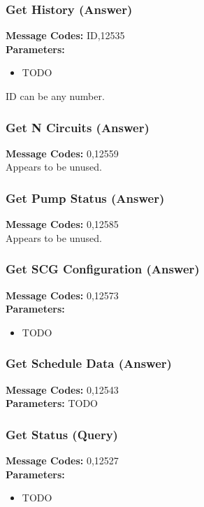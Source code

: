\documentclass[11pt]{article}
\begin{document}
\subsubsection{Get History (Answer)}
\label{msg:12535}
{\bf Message Codes: } ID,12535\\
{\bf Parameters: }
\small
\begin{itemize}
\item {\color{red} TODO}
\end{itemize}
\normalsize
ID can be any number.

\subsubsection{Get N Circuits (Answer)}
\label{msg:12559}
{\bf Message Codes: } 0,12559\\
Appears to be unused.


\subsubsection{Get Pump Status (Answer)}
\label{msg:12585}
{\bf Message Codes: } 0,12585\\
Appears to be unused.

\subsubsection{Get SCG Configuration (Answer)}
\label{msg:12573}
{\bf Message Codes: } 0,12573\\
{\bf Parameters: }
\small
\begin{itemize}
\item {\color{red} TODO}
\end{itemize}
\normalsize
\subsubsection{Get Schedule Data (Answer)}
\label{msg:12543}
{\bf Message Codes: } 0,12543\\
{\bf Parameters: }
TODO

\subsubsection{Get Status (Query)}
\label{msg:12527}
{\bf Message Codes: } 0,12527\\
{\bf Parameters: }
\small
\begin{itemize}
\item {\color{red} TODO}
\end{itemize}
\normalsize
\end{document}
